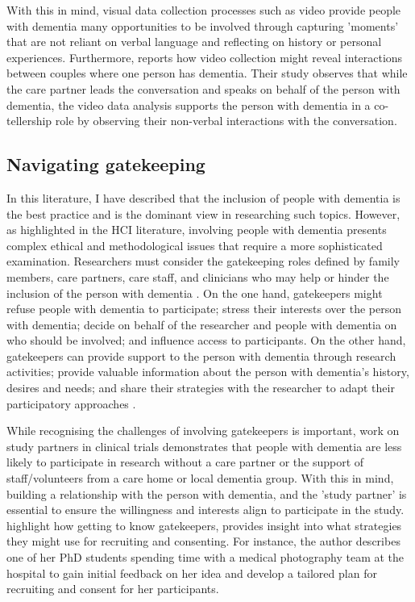 With this in mind, visual data collection processes such as video provide people with dementia many opportunities to be involved through capturing 'moments' that are not reliant on verbal language and reflecting on history or personal experiences. Furthermore, \cite{majlesi2017video} reports how video collection might reveal interactions between couples where one person has dementia. Their study observes that while the care partner leads the conversation and speaks on behalf of the person with dementia, the video data analysis supports the person with dementia in a co-tellership role by observing their non-verbal interactions with the conversation.

\subsection{Navigating gatekeeping}
\label{BL:EthicalDilemmas}
In this literature, I have described that the inclusion of people with dementia is the best practice and is the dominant view in researching such topics. However, as highlighted in the HCI literature, involving people with dementia presents complex ethical and methodological issues that require a more sophisticated examination. Researchers must consider the gatekeeping roles defined by family members, care partners, care staff, and clinicians who may help or hinder the inclusion of the person with dementia \cite{ries2020ethical}. On the one hand, gatekeepers might refuse people with dementia to participate; stress their interests over the person with dementia; decide on behalf of the researcher and people with dementia on who should be involved; and influence access to participants. On the other hand, gatekeepers can provide support to the person with dementia through research activities; provide valuable information about the person with dementia's history, desires and needs; and share their strategies with the researcher to adapt their participatory approaches \citep{novek2019safe}.

While recognising the challenges of involving gatekeepers is important, \cite{grill2014facilitating} work on study partners in clinical trials demonstrates that people with dementia are less likely to participate in research without a care partner or the support of staff/volunteers from a care home or local dementia group. With this in mind, building a relationship with the person with dementia, and the 'study partner' is essential to ensure the willingness and interests align to participate in the study. \cite{bartlett2019strategies} highlight how getting to know gatekeepers, provides insight into what strategies they might use for recruiting and consenting. For instance, the author describes one of her PhD students spending time with a medical photography team at the hospital to gain initial feedback on her idea and develop a tailored plan for recruiting and consent for her participants. 

